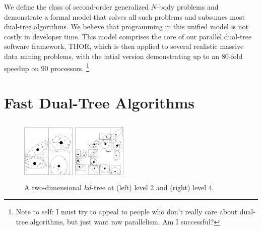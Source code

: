 \documentclass[twoside,leqno,twocolumn]{article}
\newcommand{\authornote}[1]{\footnote{Note to self: #1}}
\newcommand{\authorsnote}[1]{\authornote{#1}}
\begin{document}
We define the class of second-order generalized $N$-body problems and demonstrate a formal model that solves all such problems and subsumes most dual-tree algorithms.
We believe that programming in this unified model is not costly in developer time.
This model comprises the core of our parallel dual-tree software framework, THOR, which is then applied to several realistic massive data mining problems, with the intial version demonstrating up to an 80-fold speedup on 90 processors.
\authorsnote{I must try to appeal to people who don't really care about dual-tree algorithms, but just want raw parallelism.  Am I successful?}

\section{Fast Dual-Tree Algorithms}

\begin{figure}[t]
  \centering
  \begin{minipage}{3.2in}
    \begin{minipage}{1.05in}
      \includegraphics[width=1.0in,height=1.2in]{kdtree-level2.ps}
    \end{minipage}
    \begin{minipage}{1.05in}
      \includegraphics[width=1.0in,height=1.2in]{kdtree-level4.ps}
    \end{minipage}
    \begin{minipage}{1.0in}
      \footnotesize{\caption{\label{fig:kdtree} A two-dimensional
          $kd$-tree at (left) level 2 and (right) level 4.}}
    \end{minipage}
  \end{minipage}
\end{figure}
\end{document}
